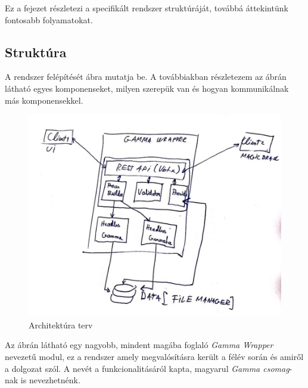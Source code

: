 Ez a fejezet részletezi a specifikált rendszer struktúráját, továbbá áttekintünk fontosabb folyamatokat.
\subsection{Struktúra}

A rendszer felépítését  ábra mutatja be. A továbbiakban részletezem az ábrán látható egyes komponenseket, milyen szerepük van és hogyan kommunikálnak más komponensekkel.
\begin{figure}[t]
	\includegraphics[width=150mm, keepaspectratio]{figures/architecture.jpg}
	\caption{Architektúra terv}
	\label{fig:structure}
\end{figure}
Az ábrán látható egy nagyobb, mindent magába foglaló \textit{Gamma Wrapper} nevezetű modul, ez a rendszer amely megvalósításra került a félév során és amiről a dolgozat szól. A nevét a funkcionalitásáról kapta, magyarul \textit{Gamma csomag}-nak is nevezhetnénk.

